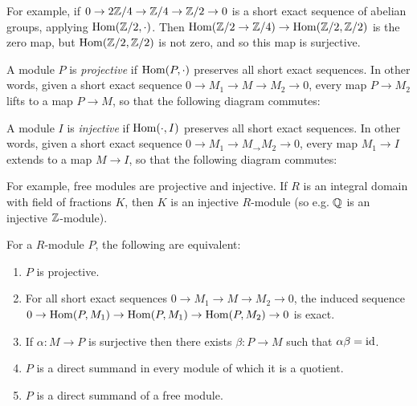 \documentclass[10pt,a4paper]{article}
\begin{document}
For example, if $0 \to 2\mathbb{Z}/4 \to \mathbb{Z}/4 \to \mathbb{Z}/2 \to 0$ is a short exact sequence of abelian groups, applying $\operatorname{Hom}(\mathbb{Z}/2, \cdot)$. Then $\operatorname{Hom}(\mathbb{Z}/2 \to \mathbb{Z}/4) \to \operatorname{Hom}(\mathbb{Z}/2, \mathbb{Z}/2)$  is the zero map, but $\operatorname{Hom}(\mathbb{Z}/2, \mathbb{Z}/2)$ is not zero, and so this map is surjective.
\begin{definition}
  A module $P$ is \emph{projective} if $\operatorname{Hom}(P, \cdot)$ preserves all short exact sequences. In other words, given a short exact sequence $0 \to M_1 \to M \to M_2 \to 0$, every map $P \to M_2$ lifts to a map $P \to M$, so that the following diagram commutes:
  \begin{center}
  \end{center}
\end{definition}
\begin{definition}
  A module $I$ is \emph{injective} if $\operatorname{Hom}(\cdot, I)$ preserves all short exact sequences. In other words, given a short exact sequence $0 \to M_1 \to M_ \to M_2 \to 0$, every map $M_1 \to I$ extends to a map $M\to I$, so that the following diagram commutes:
  \begin{center}
  \end{center}
\end{definition}
For example, free modules are projective and injective. If $R$ is an integral domain with field of fractions $K$, then $K$ is an injective $R$-module (so e.g. $\mathbb{Q}$ is an injective $\mathbb{Z}$-module).
\begin{lemma}
  For a $R$-module $P$, the following are equivalent:
  \begin{enumerate}
    \item $P$ is projective.
    \item For all short exact sequences $0 \to M_1 \to M \to M_2 \to 0$, the induced sequence $0 \to \operatorname{Hom}(P, M_1) \to \operatorname{Hom}(P, M_1) \to \operatorname{Hom}(P, M_2) \to 0$ is exact.
    \item If $\alpha: M \to P$ is surjective then there exists $\beta: P \to M$ such that $\alpha \beta = \operatorname{id}$.
    \item $P$ is a direct summand in every module of which it is a quotient.
    \item $P$ is a direct summand of a free module.
  \end{enumerate}
\end{lemma}
\end{document}
